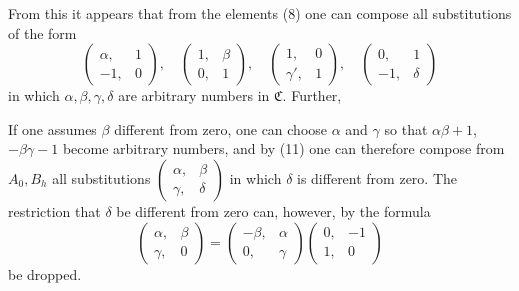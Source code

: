 From this it appears that from the elements (8) one can compose all substitutions of the form
\[ \begin{pmatrix} \alpha, & 1 \\ -1, & 0 \end{pmatrix}, \quad \begin{pmatrix} 1, & \beta \\ 0, & 1 \end{pmatrix}, \quad \begin{pmatrix} 1, & 0 \\ \gamma', & 1 \end{pmatrix}, \quad \begin{pmatrix} 0, & 1 \\ -1, & \delta \end{pmatrix} \]
in which $\alpha, \beta, \gamma, \delta$ are arbitrary numbers in $\mathfrak{C}$. Further,

If one assumes $\beta$ different from zero, one can choose $\alpha$ and $\gamma$ so that $\alpha\beta + 1$, $-\beta\gamma - 1$ become arbitrary numbers, and by (11) one can therefore compose from $A_0, B_h$ all substitutions $\begin{pmatrix} \alpha, & \beta \\ \gamma, & \delta \end{pmatrix}$ in which $\delta$ is different from zero. The restriction that $\delta$ be different from zero can, however, by the formula
\[ \begin{pmatrix} \alpha, & \beta \\ \gamma, & 0 \end{pmatrix} = \begin{pmatrix} -\beta, & \alpha \\ 0, & \gamma \end{pmatrix}\begin{pmatrix} 0, & -1 \\ 1, & 0 \end{pmatrix} \]
be dropped.
